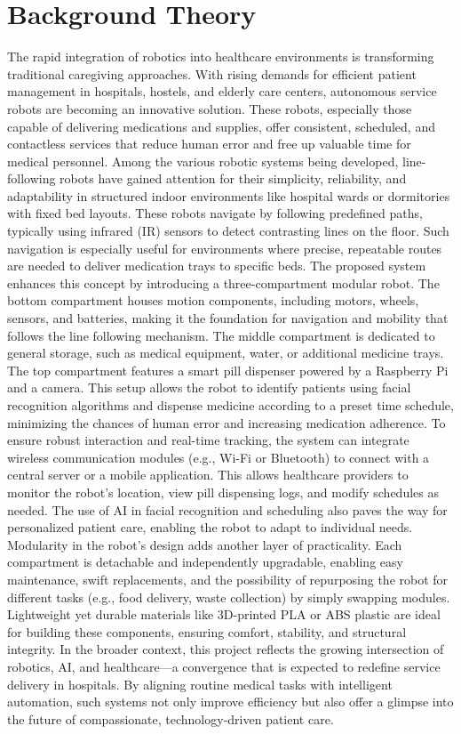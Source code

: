 \section{Background Theory}
The rapid integration of robotics into healthcare environments is transforming traditional caregiving approaches. With rising demands for efficient patient management in hospitals, hostels, and elderly care centers, autonomous service robots are becoming an innovative solution. These robots, especially those capable of delivering medications and supplies, offer consistent, scheduled, and contactless services that reduce human error and free up valuable time for medical personnel.
Among the various robotic systems being developed, line-following robots have gained attention for their simplicity, reliability, and adaptability in structured indoor environments like hospital wards or dormitories with fixed bed layouts. These robots navigate by following predefined paths, typically using infrared (IR) sensors to detect contrasting lines on the floor. Such navigation is especially useful for environments where precise, repeatable routes are needed to deliver medication trays to specific beds.
The proposed system enhances this concept by introducing a three-compartment modular robot. The bottom compartment houses motion components, including motors, wheels, sensors, and batteries, making it the foundation for navigation and mobility that follows the line following mechanism. The middle compartment is dedicated to general storage, such as medical equipment, water, or additional medicine trays. The top compartment features a smart pill dispenser powered by a Raspberry Pi and a camera. This setup allows the robot to identify patients using facial recognition algorithms and dispense medicine according to a preset time schedule, minimizing the chances of human error and increasing medication adherence.
To ensure robust interaction and real-time tracking, the system can integrate wireless communication modules (e.g., Wi-Fi or Bluetooth) to connect with a central server or a mobile application. This allows healthcare providers to monitor the robot’s location, view pill dispensing logs, and modify schedules as needed. The use of AI in facial recognition and scheduling also paves the way for personalized patient care, enabling the robot to adapt to individual needs.
Modularity in the robot’s design adds another layer of practicality. Each compartment is detachable and independently upgradable, enabling easy maintenance, swift replacements, and the possibility of repurposing the robot for different tasks (e.g., food delivery, waste collection) by simply swapping modules. Lightweight yet durable materials like 3D-printed PLA or ABS plastic are ideal for building these components, ensuring comfort, stability, and structural integrity.
In the broader context, this project reflects the growing intersection of robotics, AI, and healthcare—a convergence that is expected to redefine service delivery in hospitals. By aligning routine medical tasks with intelligent automation, such systems not only improve efficiency but also offer a glimpse into the future of compassionate, technology-driven patient care.



